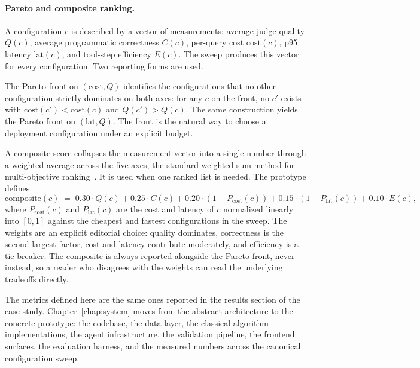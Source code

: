 \paragraph{Pareto and composite ranking.} A configuration $c$ is
described by a vector of measurements: average judge quality
$Q(c)$, average programmatic correctness $C(c)$, per-query cost
$\mathrm{cost}(c)$, p95 latency $\mathrm{lat}(c)$, and tool-step
efficiency $E(c)$. The sweep produces this vector for every
configuration. Two reporting forms are used.

The Pareto front on $(\mathrm{cost}, Q)$ identifies the
configurations that no other configuration strictly dominates on
both axes: for any $c$ on the front, no $c'$ exists with
$\mathrm{cost}(c') < \mathrm{cost}(c)$ and $Q(c') > Q(c)$. The
same construction yields the Pareto front on
$(\mathrm{lat}, Q)$. The front is the natural way to choose
a deployment configuration under an explicit budget.

A composite score collapses the measurement vector into a single
number through a weighted average across the five axes, the
standard weighted-sum method for multi-objective
ranking~\cite{MarlerArora2010}. It is used
when one ranked list is needed. The prototype defines
\begin{equation}
  \mathrm{composite}(c) \;=\;
  0.30 \cdot Q(c) +
  0.25 \cdot C(c) +
  0.20 \cdot (1 - P_{\mathrm{cost}}(c)) +
  0.15 \cdot (1 - P_{\mathrm{lat}}(c)) +
  0.10 \cdot E(c),
  \label{eq:composite}
\end{equation}
where $P_{\mathrm{cost}}(c)$ and $P_{\mathrm{lat}}(c)$ are the
cost and latency of $c$ normalized linearly into $[0, 1]$ against
the cheapest and fastest configurations in the sweep. The weights
are an explicit editorial choice: quality dominates, correctness
is the second largest factor, cost and latency contribute
moderately, and efficiency is a tie-breaker. The composite is
always reported alongside the Pareto front, never instead, so a
reader who disagrees with the weights can read the underlying
tradeoffs directly.

The metrics defined here are the same ones reported in the
results section of the case study.
Chapter~\ref{chap:system} moves from the abstract architecture
to the concrete prototype:
the codebase, the data layer, the classical algorithm
implementations, the agent infrastructure, the validation
pipeline, the frontend surfaces, the evaluation harness, and the
measured numbers across the canonical configuration sweep.
